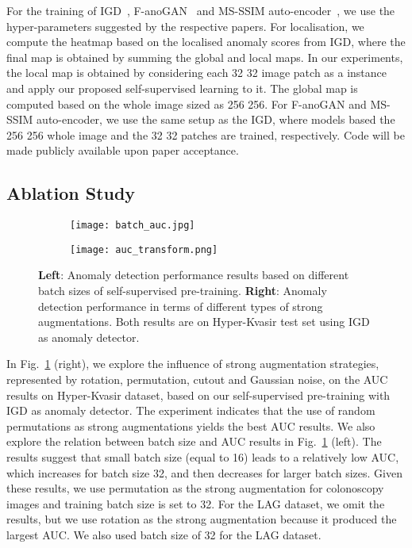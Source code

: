 \documentclass[runningheads]{llncs}
\begin{document}
For the training of IGD~\cite{chen2021unsupervised}, F-anoGAN~\cite{F-anoGAN} and MS-SSIM auto-encoder~\cite{chen2021unsupervised}, we use the hyper-parameters suggested by the respective papers. 
For localisation, we compute the heatmap based on the localised anomaly scores from IGD, where the final map is obtained by summing the global and local maps. 
In our experiments, the local map is obtained by considering each 32  32 image patch as a instance and apply our proposed self-supervised learning to it. The global map is computed based on the whole image sized as 256  256. For F-anoGAN and MS-SSIM auto-encoder, we use the same setup as the IGD, where models based the 256  256 whole image and the 32  32 patches are trained, respectively.
Code will be made publicly available upon paper acceptance. 



\subsection{Ablation Study}



\begin{figure}[t]
\begin{subfigure}{.5\textwidth}
\centering
  \texttt{[image: batch\_auc.jpg]}
\end{subfigure}\begin{subfigure}{.5\textwidth}
\centering
\texttt{[image: auc\_transform.png]}
\end{subfigure}\caption{\textbf{Left}: Anomaly detection performance results based on different batch sizes of self-supervised pre-training. \textbf{Right}: Anomaly detection performance in terms of different types of strong augmentations. Both results are on Hyper-Kvasir test set using IGD as anomaly detector. }
\label{fig:batch_transform_results}
\end{figure}

In Fig.~\ref{fig:batch_transform_results} (right), we explore the influence of strong augmentation strategies, represented by  rotation, permutation, cutout and Gaussian noise, on the AUC results on Hyper-Kvasir dataset, based on our self-supervised pre-training with IGD as anomaly detector. 
The experiment indicates that the use of random permutations as strong augmentations yields the best AUC results. 
We also explore the relation between batch size and AUC results in Fig.~\ref{fig:batch_transform_results} (left). The results suggest that 
small batch size (equal to 16) leads to a relatively low AUC, which increases for batch size 32, and then decreases for larger batch sizes.
Given these results, we use permutation as the strong augmentation for colonoscopy images and training batch size is set to 32.
For the LAG dataset, we omit the results, but we use rotation as the strong augmentation because it produced the largest AUC. We also used batch size of 32 for the LAG dataset.
\end{document}
